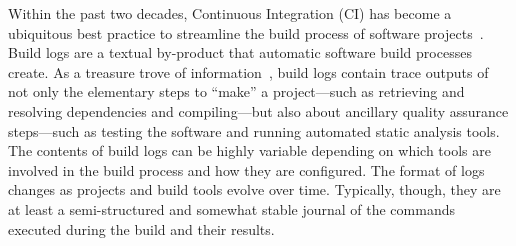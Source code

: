 



Within the past two decades, Continuous Integration (CI) has become a
ubiquitous best practice to streamline the build process of software
projects~\cite{hilton2016usage,beller2017oops,staahl2014modeling}.
Build logs are a textual by-product that automatic software build
processes create.
As a treasure trove of information~\cite{meyer},
build logs contain trace outputs of not only the elementary steps to
``make'' a project---such as retrieving and resolving dependencies and
compiling---but also about ancillary quality assurance steps---such as
testing the software and running automated static analysis tools.
The
contents of build logs can be highly variable depending on which tools
are involved in the build process and how they are
configured.
The format of logs changes as projects and build tools evolve over time.
Typically, though, they are at least a semi-structured and
somewhat stable journal of the commands executed during the build and
their results.

